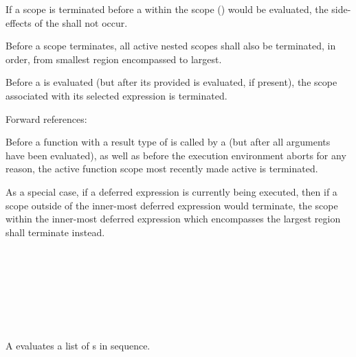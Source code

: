 \specsubsubitem
If a scope is terminated before a  within the
scope () would be
evaluated, the side-effects of the  shall not occur.

\specsubsubitem
Before a scope terminates, all active nested scopes shall also be terminated, in
order, from smallest region encompassed to largest.

\specsubsubitem
Before a  is evaluated (but after its provided
 is evaluated, if present), the scope associated with
its selected expression is terminated.

Forward references: 

\specsubsubitem
Before a function with a result type of  is called by a
 (but after all arguments have been evaluated), as
well as before the execution environment aborts for any reason, the active
function scope most recently made active is terminated.

\specsubsubitem
As a special case, if a deferred expression is currently being executed, then if
a scope outside of the inner-most deferred expression would terminate, the scope
within the inner-most deferred expression which encompasses the largest region
shall terminate instead.



\begin{grammar}
 \\
	 \terminal{;}  \\
	 \terminal{;}  \\
	 \terminal{;}  \\

 \\
	 \terminal{\{}  \terminal{\}} \\
\end{grammar}

\specsubsubitem
A  evaluates a list of
s in sequence.

